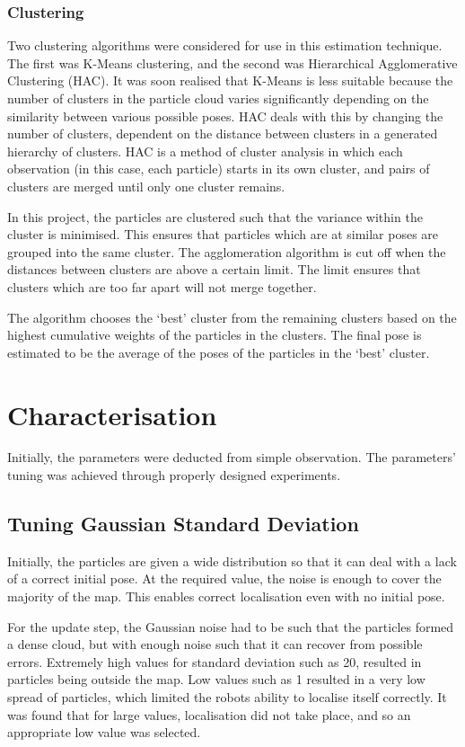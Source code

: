 \documentclass[a4paper, 10pt, conference]{ieeeconf}      %
\begin{document}
\subsubsection{Clustering}
Two clustering algorithms were considered for use in this estimation technique. The first was K-Means clustering, and the second was Hierarchical Agglomerative Clustering (HAC). It was soon realised that K-Means is less suitable because the number of clusters in the particle cloud varies significantly depending on the similarity between various possible poses. HAC deals with this by changing the number of clusters, dependent on the distance between clusters in a generated hierarchy of clusters.
HAC is a method of cluster analysis in which each observation (in this case, each particle) starts in its own cluster, and pairs of clusters are merged until only one cluster remains.

In this project, the particles are clustered such that the variance within the cluster is minimised. This ensures that particles which are at similar poses are grouped into the same cluster. The agglomeration algorithm is cut off when the distances between clusters are above a certain limit. The limit ensures that clusters which are too far apart will not merge together. 

The algorithm chooses the ‘best’ cluster from the remaining clusters based on the highest cumulative weights of the particles in the clusters. The final pose is estimated to be the average of the poses of the particles in the ‘best’ cluster.

\section{Characterisation}
Initially, the parameters were deducted from simple observation. The parameters' tuning was achieved through properly designed experiments.

\subsection{Tuning Gaussian Standard Deviation}
Initially, the particles are given a wide distribution so that it can deal with a lack of a correct initial pose. At the required value, the noise is enough to cover the majority of the map. This enables correct localisation even with no initial pose.

For the update step, the Gaussian noise had to be such that the particles formed a dense cloud, but with enough noise such that it can recover from possible errors. Extremely high values for standard deviation such as 20, resulted in particles being outside the map. Low values such as 1 resulted in a very low spread of particles, which limited the robots ability to localise itself correctly. It was found that for large values, localisation did not take place, and so an appropriate low value was selected.
\end{document}
